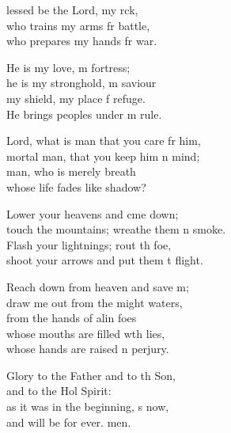 \settowidth{\versewidth}{touch the mountains; wreathe them in smoke.}
\begin{psalmverse}%
  \begin{patverse}
lessed be the Lord, my rck,\Flex\\
    who trains my arms fr battle,\Med\\
    who prepares my hands fr war.

He is my love, m fortress;\Med\\
    he is my stronghold, m saviour\\
my shield, my place f refuge.\Med\\
    He brings peoples under m rule.

Lord, what is man that you care fr him,\Med\\
    mortal man, that you keep him \pointup{\i}n mind;\\
man, who is merely  breath\Med\\
    whose life fades like  shadow?

Lower your heavens and cme down;\Med\\
    touch the mountains; wreathe them \pointup{\i}n smoke.\\
Flash your lightnings; rout th foe,\Med\\
    shoot your arrows and put them t flight.

Reach down from heaven and save m;\Flex\\
    draw me out from the might waters,\Med\\
    from the hands of alin foes\\
whose mouths are filled w\pointup{\i}th lies,\Med\\
    whose hands are raised \pointup{\i}n perjury.

Glory to the Father and to th Son,\Med\\
    and to the Hol Spirit:\\
as it was in the beginning, \pointup{\i}s now,\Med\\
    and will be for ever. men.
  \end{patverse}
\end{psalmverse}
